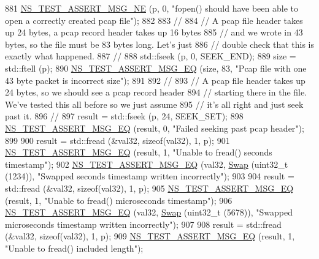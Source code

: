 \begin{DoxyCode}
881   \hyperlink{group__testing_ga73d66fb0050a5111453fd144e767b91a}{NS\_TEST\_ASSERT\_MSG\_NE} (p, 0, \textcolor{stringliteral}{"fopen() should have been able to open a correctly
       created pcap file"});
882 
883   \textcolor{comment}{//}
884   \textcolor{comment}{// A pcap file header takes up 24 bytes, a pcap record header takes up 16 bytes}
885   \textcolor{comment}{// and we wrote in 43 bytes, so the file must be 83 bytes long.  Let's just}
886   \textcolor{comment}{// double check that this is exactly what happened.}
887   \textcolor{comment}{//}
888   std::fseek (p, 0, SEEK\_END);
889   size = std::ftell (p);
890   \hyperlink{group__testing_ga2a9d78cffb3db8e867c35fff0b698cf5}{NS\_TEST\_ASSERT\_MSG\_EQ} (size, 83, \textcolor{stringliteral}{"Pcap file with one 43 byte packet is incorrect
       size"});
891 
892   \textcolor{comment}{//}
893   \textcolor{comment}{// A pcap file header takes up 24 bytes, so we should see a pcap record header}
894   \textcolor{comment}{// starting there in the file.  We've tested this all before so we just assume}
895   \textcolor{comment}{// it's all right and just seek past it.}
896   \textcolor{comment}{//}
897   result = std::fseek (p, 24, SEEK\_SET);
898   \hyperlink{group__testing_ga2a9d78cffb3db8e867c35fff0b698cf5}{NS\_TEST\_ASSERT\_MSG\_EQ} (result, 0, \textcolor{stringliteral}{"Failed seeking past pcap header"});
899 
900   result = std::fread (&val32, \textcolor{keyword}{sizeof}(val32), 1, p);
901   \hyperlink{group__testing_ga2a9d78cffb3db8e867c35fff0b698cf5}{NS\_TEST\_ASSERT\_MSG\_EQ} (result, 1, \textcolor{stringliteral}{"Unable to fread() seconds timestamp"});
902   \hyperlink{group__testing_ga2a9d78cffb3db8e867c35fff0b698cf5}{NS\_TEST\_ASSERT\_MSG\_EQ} (val32, \hyperlink{pcap-file-test-suite_8cc_a9baeceaeb66adfc7bddae33a81ad8fa7}{Swap} (uint32\_t (1234)), \textcolor{stringliteral}{"Swapped seconds timestamp
       written incorrectly"});
903 
904   result = std::fread (&val32, \textcolor{keyword}{sizeof}(val32), 1, p);
905   \hyperlink{group__testing_ga2a9d78cffb3db8e867c35fff0b698cf5}{NS\_TEST\_ASSERT\_MSG\_EQ} (result, 1, \textcolor{stringliteral}{"Unable to fread() microseconds timestamp"});
906   \hyperlink{group__testing_ga2a9d78cffb3db8e867c35fff0b698cf5}{NS\_TEST\_ASSERT\_MSG\_EQ} (val32, \hyperlink{pcap-file-test-suite_8cc_a9baeceaeb66adfc7bddae33a81ad8fa7}{Swap} (uint32\_t (5678)), \textcolor{stringliteral}{"Swapped microseconds
       timestamp written incorrectly"});
907 
908   result = std::fread (&val32, \textcolor{keyword}{sizeof}(val32), 1, p);
909   \hyperlink{group__testing_ga2a9d78cffb3db8e867c35fff0b698cf5}{NS\_TEST\_ASSERT\_MSG\_EQ} (result, 1, \textcolor{stringliteral}{"Unable to fread() included length"});

\end{DoxyCode}
